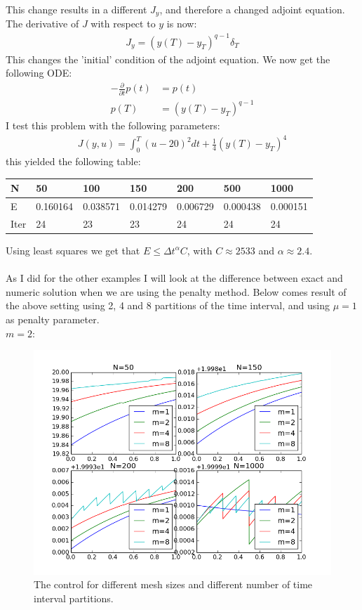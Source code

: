 \documentclass[11pt,a4paper]{article}
\begin{document}
This change results in a different $J_y$, and therefore a changed adjoint equation. The derivative of $J$ with respect to $y$ is now:
\begin{align*}
J_y = (y(T)-y_T)^{q-1}\delta_T
\end{align*}
This changes the 'initial' condition of the adjoint equation. We now get the following ODE:
\begin{align*}
-\frac{\partial }{\partial t}p(t) &=p(t)  \\
p(T) &= (y(T)-y_T)^{q-1}
\end{align*}
I test this problem with the following parameters:
\begin{align*}
J(y,u) = \int_0^T (u-20)^2 dt + \frac{1}{4}(y(T)-y_T)^4
\end{align*}
this yielded the following table: 
\begin{center}
    \begin{tabular}{| l | l | l | l | l | l | l |}
    \hline
    N & 50 & 100  & 150 & 200 & 500 & 1000 \\ \hline
    E & 0.160164 & 0.038571 &0.014279 & 0.006729 & 0.000438 & 0.000151	\\ \hline
    Iter & 24 & 23  & 23 & 24 & 24 & 24 \\ \hline
    \end{tabular}
\end{center}
Using least squares we get that $E\leq \Delta t^{\alpha}C$, with $C\approx 2533$ and $\alpha\approx2.4$.
\\
\\
As I did for the other examples I will look at the difference between exact and numeric solution when we are using the penalty method. Below comes result of the above setting using 2, 4 and 8 partitions of the time interval, and using $\mu=1$ as penalty parameter.
\\
$m=2$:
\begin{figure}
  \includegraphics[width=\linewidth]{resC_manu_control.png}
  \caption{The control for different mesh sizes and different number of time interval partitions. }
  \label{Fig 5}
\end{figure}
\end{document}
